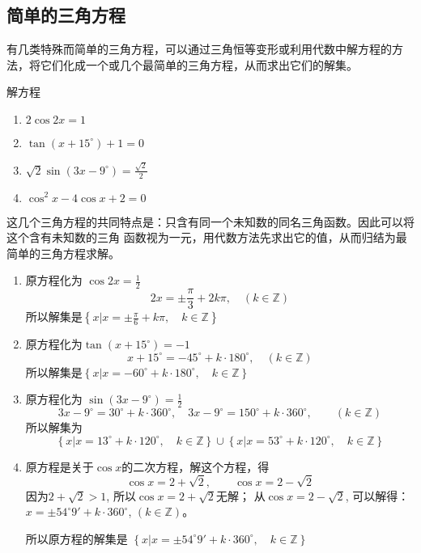 \subsection{简单的三角方程}

有几类特殊而简单的三角方程，可以通过三角恒等变形或利用代数中解方程的方法，将它们化成一个或几个最简单的三角方程，从而求出它们的解集。

\begin{example}
    解方程
\begin{multicols}{2}
\begin{enumerate}
\item $2\cos2x=1$
\item $\tan (x+15^{\circ})+1=0$
\item $\sqrt{2}\sin(3x-9^{\circ})=\frac{\sqrt{2}}{2}$
\item $\cos^2x-4\cos x+2=0$
\end{enumerate}
\end{multicols}
\end{example}

\begin{analyze}
  这几个三角方程的共同特点是：只含有同一个未知数的同名三角函数。因此可以将这个含有未知数的三角  
  函数视为一元，用代数方法先求出它的值，从而归结为最简单的三角方程求解。
\end{analyze}

\begin{solution}
 \begin{enumerate}
     \item 原方程化为 $\cos 2x=\frac{1}{2}$
\[2x=\pm\frac{\pi}{3}+2k\pi,\quad (k\in\mathbb{Z})\] 
所以解集是$\left\{x\Big|x=\pm\frac{\pi}{6}+k\pi,\quad k\in\mathbb{Z}\right\}$
\item  原方程化为$\tan(x+15^{\circ})=-1$
\[x+15^{\circ}=-45^{\circ}+k\cdot 180^{\circ},\quad (k\in\mathbb{Z})\]
所以解集是$\left\{x\Big|x=-60^{\circ}+k\cdot 180^{\circ},\quad k\in\mathbb{Z}\right\}$
\item 原方程化为 $\sin(3x-9^{\circ})=\frac{1}{2}$
\[3x-9^{\circ}=30^{\circ}+k\cdot 360^{\circ},\quad 3x-9^{\circ}=150^{\circ}+k\cdot 360^{\circ},\qquad (k\in\mathbb{Z})\]
所以解集为$$\left\{x\Big|x=13^{\circ}+k\cdot 120^{\circ},\quad k\in\mathbb{Z}\right\}\cup \left\{x\Big|x=53^{\circ}+k\cdot 120^{\circ},\quad k\in\mathbb{Z}\right\}$$
\item 原方程是关于$\cos x$的二次方程，解这个方程，得
\[\cos x=2+\sqrt{2},\qquad \cos x=2-\sqrt{2}\]
因为$2+\sqrt{2}>1$, 所以$\cos x=2+\sqrt{2}$无解；
从$\cos x=2-\sqrt{2}$, 可以解得：$x=\pm 54^{\circ}9'+k\cdot 360^{\circ}$, $(k\in\mathbb{Z})$。

所以原方程的解集是
$\left\{x\Big|x=\pm 54^{\circ}9'+k\cdot 360^{\circ},\quad k\in\mathbb{Z}\right\}$
 \end{enumerate}  
\end{solution}

